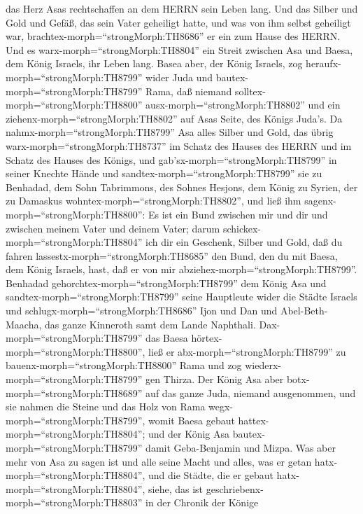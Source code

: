 das Herz Asas rechtschaffen an dem HERRN sein Leben lang. 
Und das Silber und Gold und Gefäß, das sein Vater geheiligt hatte, und
was von ihm selbst geheiligt war, brachtex-morph=``strongMorph:TH8686''
er ein zum Hause des HERRN.  Und es
warx-morph=``strongMorph:TH8804'' ein Streit zwischen Asa und Baesa, dem
König Israels, ihr Leben lang.  Basea aber, der König
Israels, zog heraufx-morph=``strongMorph:TH8799'' wider Juda und
bautex-morph=``strongMorph:TH8799'' Rama, daß niemand
solltex-morph=``strongMorph:TH8800'' ausx-morph=``strongMorph:TH8802''
und ein ziehenx-morph=``strongMorph:TH8802'' auf Asas Seite, des Königs
Juda's.  Da nahmx-morph=``strongMorph:TH8799'' Asa alles
Silber und Gold, das übrig warx-morph=``strongMorph:TH8737'' im Schatz
des Hauses des HERRN und im Schatz des Hauses des Königs, und
gab'sx-morph=``strongMorph:TH8799'' in seiner Knechte Hände und
sandtex-morph=``strongMorph:TH8799'' sie zu Benhadad, dem Sohn
Tabrimmons, des Sohnes Hesjons, dem König zu Syrien, der zu Damaskus
wohntex-morph=``strongMorph:TH8802'', und ließ ihm
sagenx-morph=``strongMorph:TH8800'':  Es ist ein Bund
zwischen mir und dir und zwischen meinem Vater und deinem Vater; darum
schickex-morph=``strongMorph:TH8804'' ich dir ein Geschenk, Silber und
Gold, daß du fahren lassestx-morph=``strongMorph:TH8685'' den Bund, den
du mit Baesa, dem König Israels, hast, daß er von mir
abziehex-morph=``strongMorph:TH8799''.  Benhadad
gehorchtex-morph=``strongMorph:TH8799'' dem König Asa und
sandtex-morph=``strongMorph:TH8799'' seine Hauptleute wider die Städte
Israels und schlugx-morph=``strongMorph:TH8686'' Ijon und Dan und
Abel-Beth-Maacha, das ganze Kinneroth samt dem Lande Naphthali.
 Dax-morph=``strongMorph:TH8799'' das Baesa
hörtex-morph=``strongMorph:TH8800'', ließ er
abx-morph=``strongMorph:TH8799'' zu bauenx-morph=``strongMorph:TH8800''
Rama und zog wiederx-morph=``strongMorph:TH8799'' gen Thirza.
 Der König Asa aber botx-morph=``strongMorph:TH8689'' auf
das ganze Juda, niemand ausgenommen, und sie nahmen die Steine und das
Holz von Rama wegx-morph=``strongMorph:TH8799'', womit Baesa gebaut
hattex-morph=``strongMorph:TH8804''; und der König Asa
bautex-morph=``strongMorph:TH8799'' damit Geba-Benjamin und Mizpa.
 Was aber mehr von Asa zu sagen ist und alle seine Macht
und alles, was er getan hatx-morph=``strongMorph:TH8804'', und die
Städte, die er gebaut hatx-morph=``strongMorph:TH8804'', siehe, das ist
geschriebenx-morph=``strongMorph:TH8803'' in der Chronik der Könige
